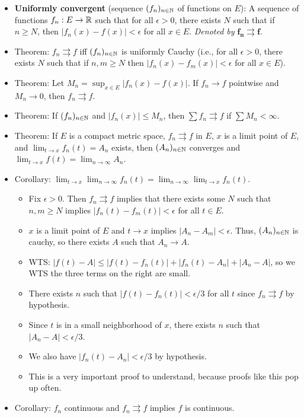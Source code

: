 \documentclass[../../notes.tex]{subfiles}
\begin{document}
\begin{itemize}
    \item \textbf{Uniformly convergent} (sequence $(f_n)_{n\in\mathbb{N}}$ of functions on $E$): A sequence of functions $f_n:E\to\mathbb{R}$ such that for all $\epsilon>0$, there exists $N$ such that if $n\geq N$, then $|f_n(x)-f(x)|<\epsilon$ for all $x\in E$. \emph{Denoted by} $\bm{f_n\rightrightarrows f}$.
    \item Theorem: $f_n\rightrightarrows f$ iff $(f_n)_{n\in\mathbb{N}}$ is uniformly Cauchy (i.e., for all $\epsilon>0$, there exists $N$ such that if $n,m\geq N$ then $|f_n(x)-f_m(x)|<\epsilon$ for all $x\in E$).
    \item Theorem: Let $M_n=\sup_{x\in E}|f_n(x)-f(x)|$. If $f_n\to f$ pointwise and $M_n\to 0$, then $f_n\rightrightarrows f$.
    \item Theorem: If $(f_n)_{n\in\mathbb{N}}$ and $|f_n(x)|\leq M_n$, then $\sum f_n\rightrightarrows f$ if $\sum M_n<\infty$.
    \item Theorem: If $E$ is a compact metric space, $f_n\rightrightarrows f$ in $E$, $x$ is a limit point of $E$, and $\lim_{t\to x}f_n(t)=A_n$ exists, then $(A_n)_{n\in\mathbb{N}}$ converges and $\lim_{t\to x}f(t)=\lim_{n\to\infty}A_n$.
    \item Corollary: $\lim_{t\to x}\lim_{n\to\infty}f_n(t)=\lim_{n\to\infty}\lim_{t\to x}f_n(t)$.
    \begin{itemize}
        \item {}Fix $\epsilon>0$. Then $f_n\rightrightarrows f$ implies that there exists some $N$ such that $n,m\geq N$ implies $|f_n(t)-f_m(t)|<\epsilon$ for all $t\in E$.
        \item $x$ is a limit point of $E$ and $t\to x$ implies $|A_n-A_m|<\epsilon$. Thus, $(A_n)_{n\in\mathbb{N}}$ is cauchy, so there exists $A$ such that $A_n\to A$.
        \item WTS: $|f(t)-A|\leq|f(t)-f_n(t)|+|f_n(t)-A_n|+|A_n-A|$, so we WTS the three terms on the right are small.
        \item There exists $n$ such that $|f(t)-f_n(t)|<\epsilon/3$ for all $t$ since $f_n\rightrightarrows f$ by hypothesis.
        \item Since $t$ is in a small neighborhood of $x$, there exists $n$ such that $|A_n-A|<\epsilon/3$.
        \item We also have $|f_n(t)-A_n|<\epsilon/3$ by hypothesis.
        \item This is a very important proof to understand, because proofs like this pop up often.
    \end{itemize}
    \item Corollary: $f_n$ continuous and $f_n\rightrightarrows f$ implies $f$ is continuous.

\end{itemize}
\end{document}

